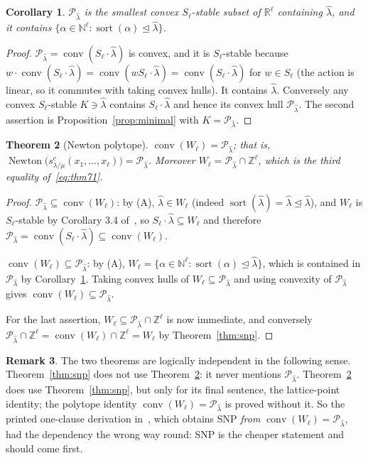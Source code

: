 \documentclass[11pt]{article}
\theoremstyle{plain}
\newtheorem{thm}{Theorem}[section]
\newtheorem{cor}[thm]{Corollary}
\theoremstyle{definition}
\newtheorem{rem}[thm]{Remark}
\DeclareMathOperator{\Newton}{Newton}
\DeclareMathOperator{\conv}{conv}
\DeclareMathOperator{\srt}{sort}
\newcommand{\N}{\mathbb{N}}
\newcommand{\Z}{\mathbb{Z}}
\newcommand{\R}{\mathbb{R}}
\newcommand{\lhat}{\hat\lambda}
\newcommand{\Perm}{\mathcal{P}}
\begin{document}
\begin{cor}\label{cor:minimalpoly}
$\Perm_{\lhat}$ is the smallest convex $S_\ell$-stable subset of $\R^{\ell}$
containing $\lhat$, and it contains $\{\alpha\in\N^{\ell}:\srt(\alpha)\trianglelefteq\lhat\}$.
\end{cor}

\begin{proof}
$\Perm_{\lhat}=\conv(S_\ell\cdot\lhat)$ is convex, and it is $S_\ell$-stable
because $w\cdot\conv(S_\ell\cdot\lhat)=\conv(w S_\ell\cdot\lhat)=\conv(S_\ell\cdot\lhat)$
for $w\in S_\ell$ (the action is linear, so it commutes with taking convex
hulls). It contains $\lhat$. Conversely any convex $S_\ell$-stable $K\ni\lhat$
contains $S_\ell\cdot\lhat$ and hence its convex hull $\Perm_{\lhat}$. The second
assertion is Proposition~\ref{prop:minimal} with $K=\Perm_{\lhat}$.
\end{proof}

\begin{thm}[Newton polytope]\label{thm:newton}
$\conv(W_\ell)=\Perm_{\lhat}$; that is,
$\Newton\bigl(s^{c}_{\lambda/\mu}(x_1,\dots,x_\ell)\bigr)=\Perm_{\lhat}$.
Moreover $W_\ell=\Perm_{\lhat}\cap\Z^{\ell}$, which is the third equality
of~\eqref{eq:thm71}.
\end{thm}

\begin{proof}
$\Perm_{\lhat}\subseteq\conv(W_\ell)$: by (A), $\lhat\in W_\ell$ (indeed
$\srt(\lhat)=\lhat\trianglelefteq\lhat$), and $W_\ell$ is $S_\ell$-stable by
Corollary 3.4 of~\cite{note1}, so $S_\ell\cdot\lhat\subseteq W_\ell$ and
therefore $\Perm_{\lhat}=\conv(S_\ell\cdot\lhat)\subseteq\conv(W_\ell)$.

$\conv(W_\ell)\subseteq\Perm_{\lhat}$: by (A),
$W_\ell=\{\alpha\in\N^{\ell}:\srt(\alpha)\trianglelefteq\lhat\}$, which is
contained in $\Perm_{\lhat}$ by Corollary~\ref{cor:minimalpoly}. Taking convex
hulls of $W_\ell\subseteq\Perm_{\lhat}$ and using convexity of $\Perm_{\lhat}$
gives $\conv(W_\ell)\subseteq\Perm_{\lhat}$.

For the last assertion, $W_\ell\subseteq\Perm_{\lhat}\cap\Z^{\ell}$ is now
immediate, and conversely
$\Perm_{\lhat}\cap\Z^{\ell}=\conv(W_\ell)\cap\Z^{\ell}=W_\ell$ by
Theorem~\ref{thm:snp}.
\end{proof}

\begin{rem}
The two theorems are logically independent in the following sense.
Theorem~\ref{thm:snp} does not use Theorem~\ref{thm:newton}: it never mentions
$\Perm_{\lhat}$. Theorem~\ref{thm:newton} does use Theorem~\ref{thm:snp}, but
only for its final sentence, the lattice-point identity; the polytope identity
$\conv(W_\ell)=\Perm_{\lhat}$ is proved without it. So the printed one-clause
derivation in~\cite{note1}, which obtains SNP \emph{from}
$\conv(W_\ell)=\Perm_{\lhat}$, had the dependency the wrong way round: SNP is the
cheaper statement and should come first.
\end{rem}
\end{document}
